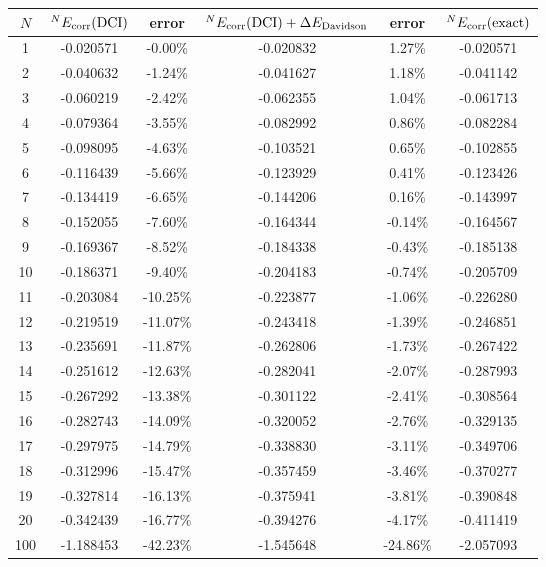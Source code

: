 \documentclass[a4paper]{book}
\newcounter{solution}[chapter]
\newcommand{\corr}{{\rm corr}}
\begin{document}
\begin{solution}
\begin{itemize}
	\begin{minipage}{0.95\linewidth}
    \centering
    \captionsetup{type=table}
    \label{tab:correlation_energy_error}
    \begin{tabular}{c|c|c|c|c|c} \hline
		$N$		&	${}^N E_\corr( {\rm DCI} )$	&	error	& ${}^N E_\corr( {\rm DCI} ) + \Delta E_{\rm Davidson}$	& error	& ${}^N E_\corr( {\rm exact} )$ \\ \hline
  1 & -0.020571 &   -0.00\% &  -0.020832 &   1.27\% &   -0.020571 \\
  2 & -0.040632 &   -1.24\% &  -0.041627 &   1.18\% &   -0.041142 \\
  3 & -0.060219 &   -2.42\% &  -0.062355 &   1.04\% &   -0.061713 \\
  4 & -0.079364 &   -3.55\% &  -0.082992 &   0.86\% &   -0.082284 \\
  5 & -0.098095 &   -4.63\% &  -0.103521 &   0.65\% &   -0.102855 \\
  6 & -0.116439 &   -5.66\% &  -0.123929 &   0.41\% &   -0.123426 \\
  7 & -0.134419 &   -6.65\% &  -0.144206 &   0.16\% &   -0.143997 \\
  8 & -0.152055 &   -7.60\% &  -0.164344 &   -0.14\% &  -0.164567 \\
  9 & -0.169367 &   -8.52\% &  -0.184338 &   -0.43\% &  -0.185138 \\
 10 & -0.186371 &   -9.40\% &  -0.204183 &   -0.74\% &  -0.205709 \\
 11 & -0.203084 &   -10.25\% & -0.223877 &   -1.06\% &  -0.226280 \\
 12 & -0.219519 &   -11.07\% & -0.243418 &   -1.39\% &  -0.246851 \\
 13 & -0.235691 &   -11.87\% & -0.262806 &   -1.73\% &  -0.267422 \\
 14 & -0.251612 &   -12.63\% & -0.282041 &   -2.07\% &  -0.287993 \\
 15 & -0.267292 &   -13.38\% & -0.301122 &   -2.41\% &  -0.308564 \\
 16 & -0.282743 &   -14.09\% & -0.320052 &   -2.76\% &  -0.329135 \\
 17 & -0.297975 &   -14.79\% & -0.338830 &   -3.11\% &  -0.349706 \\
 18 & -0.312996 &   -15.47\% & -0.357459 &   -3.46\% &  -0.370277 \\
 19 & -0.327814 &   -16.13\% & -0.375941 &   -3.81\% &  -0.390848 \\
 20 & -0.342439 &   -16.77\% & -0.394276 &   -4.17\% &  -0.411419 \\ 
100 & -1.188453 &   -42.23\% & -1.545648 &   -24.86\% & -2.057093	\\ \hline
	\end{tabular}
	\end{minipage}
	
	\end{itemize}
	
	\end{solution}	
	
\end{document}
